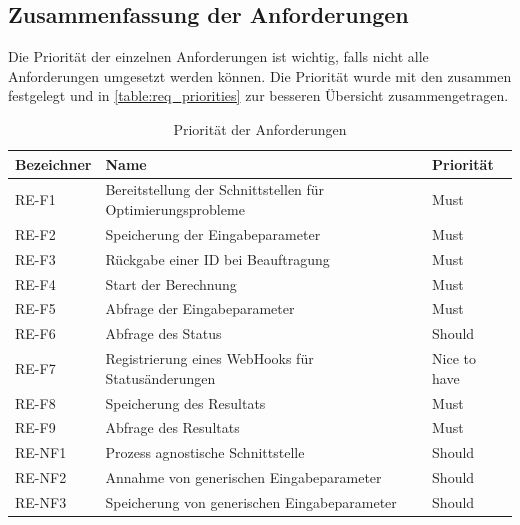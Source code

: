 \subsection{Zusammenfassung der Anforderungen}\label{toc_anfoderungen}
Die Priorität der einzelnen Anforderungen ist wichtig, falls nicht alle Anforderungen umgesetzt werden können. Die Priorität wurde mit den  zusammen festgelegt und in 
\autoref{table:req_priorities} zur besseren Übersicht zusammengetragen.
\begin{table}[ht]
\centering
  \begin{tabular}{ l | l | l }
	\hline
	\rowcolor{gray}
	\textbf{Bezeichner}	& \textbf{Name}	&	\textbf{Priorität}\\ \hline
	RE-F1 			&  Bereitstellung der Schnittstellen für Optimierungsprobleme	& Must\\ \hline
	RE-F2 			&  Speicherung der Eingabeparameter	& Must\\ \hline
	RE-F3 			&  Rückgabe einer ID bei Beauftragung	& Must\\ \hline
	RE-F4 			&  Start der Berechnung	& Must\\ \hline
	RE-F5 			&  Abfrage der Eingabeparameter	& Must\\ \hline
	RE-F6 			&  Abfrage des Status	& Should\\ \hline
	RE-F7 			&  Registrierung eines WebHooks für Statusänderungen	& Nice to have\\ \hline
	RE-F8 			&  Speicherung des Resultats	& Must\\ \hline
	RE-F9 			&  Abfrage des Resultats	& Must\\ \hline
	RE-NF1 			&  Prozess agnostische Schnittstelle & Should\\ \hline
	RE-NF2 			&  Annahme von generischen Eingabeparameter & Should\\ \hline
	RE-NF3 			&  Speicherung von generischen Eingabeparameter & Should\\ \hline
  \end{tabular}
   \caption{Priorität der Anforderungen}\label{table:req_priorities}
\end{table}